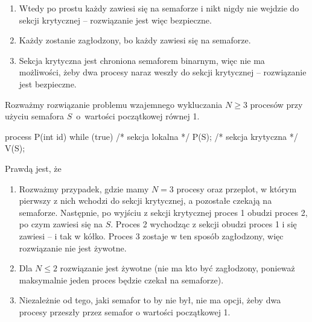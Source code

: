 \begin{solutions}
    \begin{enumerate}[\bf A.]
        \item Wtedy po prostu każdy zawiesi się na semaforze i nikt nigdy nie wejdzie do sekcji krytycznej -- rozwiązanie jest więc bezpieczne.

        \item Każdy zostanie zagłodzony, bo każdy zawiesi się na semaforze.

        \item Sekcja krytyczna jest chroniona semaforem binarnym, więc nie ma możliwości, żeby dwa procesy naraz weszły do sekcji krytycznej -- rozwiązanie jest bezpieczne.
    \end{enumerate}

    \sol Rozważmy rozwiązanie problemu wzajemnego wykluczania $N \geq 3$ procesów przy użyciu semafora $S$~o~wartości początkowej równej 1.
    \begin{cpp}
        process P(int id) {
            while (true) {
                /* sekcja lokalna */
                P(S);
                /* sekcja krytyczna */
                V(S);
            }
        }
    \end{cpp}
    Prawdą jest, że

    \begin{enumerate}[\bf A.]
        \item Rozważmy przypadek, gdzie mamy $N=3$ procesy oraz przeplot, w którym pierwszy z nich wchodzi do sekcji krytycznej, a pozostałe czekają na semaforze. Następnie, po wyjściu z sekcji krytycznej proces 1 obudzi proces 2, po czym zawiesi się na $S$. Proces 2 wychodząc z sekcji obudzi proces 1 i się zawiesi -- i tak w kółko. Proces 3 zostaje w ten sposób zagłodzony, więc rozwiązanie nie jest żywotne.

        \item Dla $N \leq 2$ rozwiązanie jest żywotne (nie ma kto być zagłodzony, ponieważ maksymalnie jeden proces będzie czekał na semaforze).

        \item Niezależnie od tego, jaki semafor to by nie był, nie ma opcji, żeby dwa procesy przeszły przez semafor o wartości początkowej 1.
    \end{enumerate}


\end{solutions}
